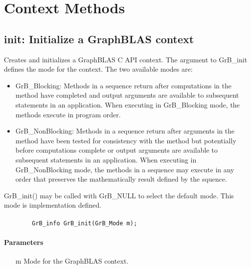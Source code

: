 \section{Context Methods}

\subsection{{\sf init}: Initialize a GraphBLAS context}

Creates and initializes a GraphBLAS C API context.  The argument
to {\sf GrB\_init} defines the mode for the context.  The two
available modes are:

\begin{itemize}
\item {\sf GrB\_Blocking}: Methods in a sequence return after
computations in the method have completed and output arguments
are available to subsequent statements in an application.  When
executing in {\sf GrB\_Blocking} mode, the methods execute 
in program order.

\item {\sf GrB\_NonBlocking}: Methods in a sequence return after
arguments in the method have been tested for consistency with the
method but potentially before computations complete or output 
arguments are available to subsequent statements in an application.
When executing in {\sf GrB\_NonBlocking} mode, the methods 
in a sequence may execute in any order that preserves the 
mathematically result defined by the squence.

\end{itemize}

{\sf GrB\_init()} may be called with {\sf GrB\_NULL} to select 
the default mode.  This mode is implementation defined.

\paragraph{\syntax}

\begin{verbatim}
        GrB_info GrB_init(GrB_Mode m);
\end{verbatim}


\paragraph{Parameters}

\begin{itemize}[leftmargin=1.1in]
	\item[{\sf m}] Mode for the GraphBLAS context.
\end{itemize}

